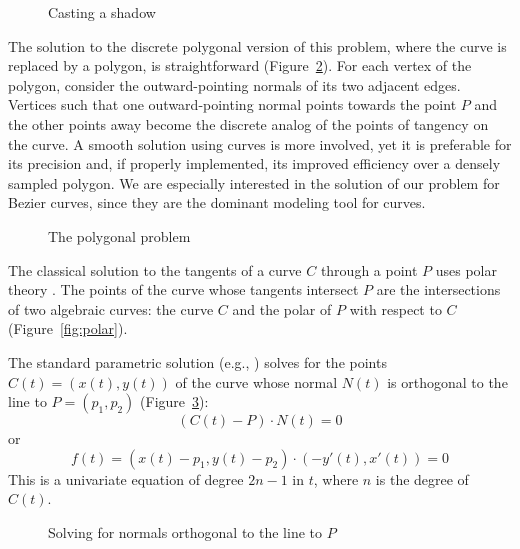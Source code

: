 \documentclass[11pt]{article}
\begin{document}


\begin{figure}
\hspace{2in} \setjjpoca
\caption{Casting a shadow}
\label{fig:shadow}
\end{figure}

The solution to the discrete polygonal version of this problem,
where the curve is replaced by a polygon, is straightforward
(Figure~\ref{fig:polygon}).
For each vertex of the polygon, consider the outward-pointing normals
of its two adjacent edges.
Vertices such that one outward-pointing normal points towards the point $P$
and the other points away become the discrete analog of the points of tangency
on the curve.
A smooth solution using curves is more involved, 
yet it is preferable for its precision and, 
if properly implemented, its improved efficiency over a densely sampled polygon.
We are especially interested in the solution of our problem for Bezier
curves, since they are the dominant modeling tool for curves.



\begin{figure}
\hspace{1.9in} \setjjpoly
\caption{The polygonal problem}
\label{fig:polygon}
\end{figure}

The classical solution to the tangents of a curve $C$
through a point $P$ uses polar theory \cite{semple85}.
The points of the curve whose tangents intersect $P$ are 
the intersections of two algebraic curves:
the curve $C$ and the polar of $P$ with respect to $C$
(Figure~\ref{fig:polar}).

The standard parametric solution (e.g., \cite{kim88})
solves for the points $C(t) = (x(t),y(t))$ of the curve whose normal $N(t)$
is orthogonal to the line to $P = (p_1,p_2)$ (Figure~\ref{fig:standard}):
\begin{equation}
\label{eq:standard}
 	(C(t) - P) \cdot N(t) = 0
\end{equation}
or
\[
	f(t) = (x(t) - p_1, y(t) - p_2) \cdot (-y'(t), x'(t)) = 0
\]
This is a univariate equation of degree $2n-1$ in $t$,
where $n$ is the degree of $C(t)$.



\begin{figure}
\hspace{1.9in} \setjjpost
\caption{Solving for normals orthogonal to the line to $P$}
\label{fig:standard}
\end{figure}
\end{document}
